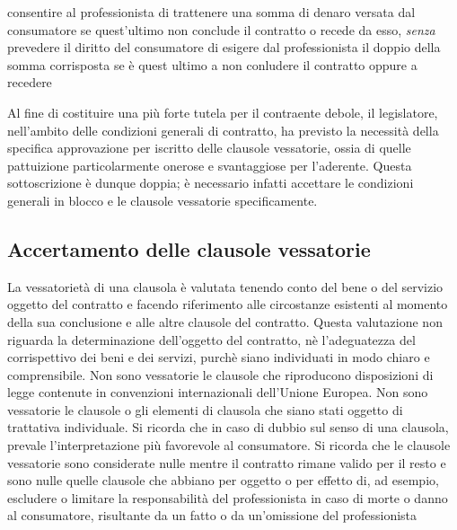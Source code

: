 consentire al professionista di trattenere una somma di denaro versata dal consumatore se quest'ultimo non conclude
il contratto o recede da esso, \emph{senza} prevedere il diritto del consumatore di esigere dal professionista
il doppio della somma corrisposta se è quest ultimo a non conludere il contratto oppure a recedere \newline \newline

Al fine di costituire una più forte tutela per il contraente debole, il legislatore, nell'ambito
delle condizioni generali di contratto, ha previsto la necessità della specifica approvazione per iscritto delle clausole
vessatorie, ossia di quelle pattuizione particolarmente onerose e svantaggiose per l'aderente. Questa sottoscrizione
è dunque doppia; è necessario infatti accettare le condizioni generali in blocco e le clausole vessatorie specificamente.

\subsection{Accertamento delle clausole vessatorie}
La vessatorietà di una clausola è valutata tenendo conto del bene o del servizio oggetto del contratto e facendo riferimento
alle circostanze esistenti al momento della sua conclusione e alle altre clausole del contratto. Questa valutazione non riguarda
la determinazione dell'oggetto del contratto, nè l'adeguatezza del corrispettivo dei beni e dei servizi, purchè siano individuati
in modo chiaro e comprensibile.\newline
Non sono vessatorie le clausole che riproducono disposizioni di legge contenute in convenzioni internazionali dell'Unione Europea.\newline
Non sono vessatorie le clausole o gli elementi di clausola che siano stati oggetto di trattativa individuale.\newline
Si ricorda che in caso di dubbio sul senso di una clausola, prevale l'interpretazione più favorevole al consumatore.\newline\newline
Si ricorda che le clausole vessatorie sono considerate nulle mentre il contratto rimane valido per il resto e sono nulle quelle clausole
che abbiano per oggetto o per effetto di, ad esempio, escludere o limitare la responsabilità del professionista in caso di
morte o danno al consumatore, risultante da un fatto o da un'omissione del professionista

